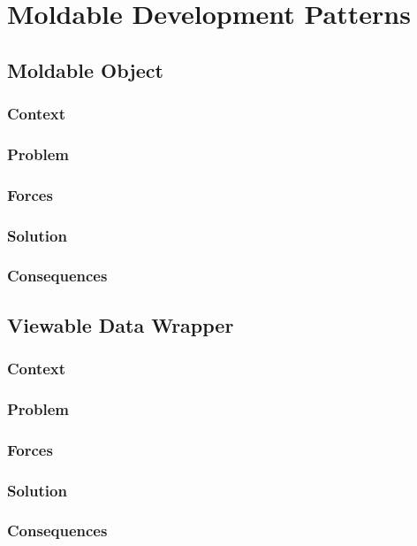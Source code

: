 \documentclass[sigconf]{acmart}
\begin{document}
\section{Moldable Development Patterns}


\subsection{Moldable Object}
\subsubsection*{Context}
\subsubsection*{Problem}
\subsubsection*{Forces}
\subsubsection*{Solution}
\subsubsection*{Consequences}


\subsection{Viewable Data Wrapper}
\subsubsection*{Context}
\subsubsection*{Problem}
\subsubsection*{Forces}
\subsubsection*{Solution}
\subsubsection*{Consequences}
\end{document}
